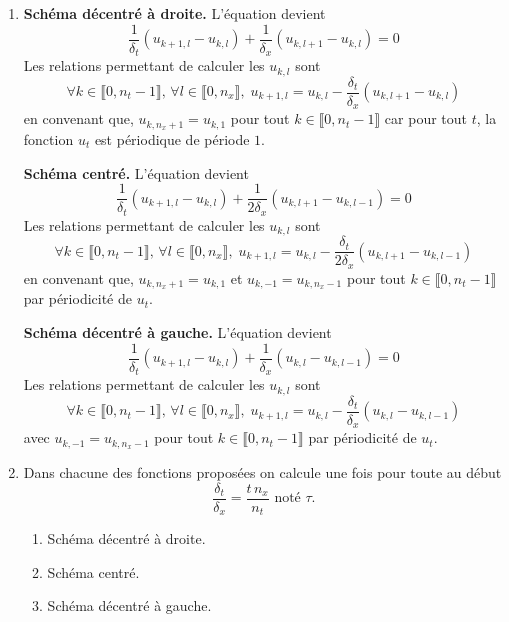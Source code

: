 \begin{enumerate}
 \item 
 \textbf{Schéma décentré à droite.} 
 L'équation devient
\[
 \frac{1}{\delta_t}\left( u_{k+1,l} - u_{k,l}\right) +  \frac{1}{\delta_x}\left( u_{k,l+1} - u_{k,l}\right) = 0
\]
Les relations permettant de calculer les $u_{k,l}$ sont
\[
 \forall k\in\llbracket 0, n_t-1\rrbracket, \, \forall l \in \llbracket 0, n_x \rrbracket, \;
 u_{k+1,l} = u_{k,l} - \frac{\delta_t}{\delta_x}\left( u_{k,l+1} - u_{k,l}\right) 
\]
en convenant que, $u_{k,n_x + 1} = u_{k,1}$ pour tout $k\in\llbracket 0, n_t-1\rrbracket$ car pour tout $t$, la fonction $u_t$ est périodique de période $1$.
 
 \textbf{Schéma centré.}
 L'équation devient
\[
 \frac{1}{\delta_t}\left( u_{k+1,l} - u_{k,l}\right) +  \frac{1}{2\delta_x}\left( u_{k,l+1} - u_{k,l-1}\right) = 0
\]
Les relations permettant de calculer les $u_{k,l}$ sont
\[
 \forall k\in\llbracket 0, n_t-1\rrbracket, \, \forall l \in \llbracket 0, n_x \rrbracket, \;
 u_{k+1,l} = u_{k,l} - \frac{\delta_t}{2\delta_x}\left( u_{k,l+1} - u_{k,l-1}\right) 
\]
en convenant que, $u_{k,n_x + 1} = u_{k,1}$ et $u_{k, -1} = u_{k,n_x - 1}$ pour tout $k\in\llbracket 0, n_t-1\rrbracket$ par périodicité de $u_t$.
 
 \textbf{Schéma décentré à gauche.}
 L'équation devient
\[
 \frac{1}{\delta_t}\left( u_{k+1,l} - u_{k,l}\right) +  \frac{1}{\delta_x}\left( u_{k,l} - u_{k,l-1}\right) = 0
\]
Les relations permettant de calculer les $u_{k,l}$ sont
\[
 \forall k\in\llbracket 0, n_t-1\rrbracket, \, \forall l \in \llbracket 0, n_x \rrbracket, \;
 u_{k+1,l} = u_{k,l} - \frac{\delta_t}{\delta_x}\left( u_{k,l} - u_{k,l-1}\right) 
\]
avec $u_{k, -1} = u_{k,n_x - 1}$ pour tout $k\in\llbracket 0, n_t-1\rrbracket$ par périodicité de $u_t$.

 \item
 Dans chacune des fonctions proposées on calcule une fois pour toute au début 
\[
\frac{\delta_t}{\delta_x}=\frac{t\,n_x}{n_t} \text{ noté } \tau. 
\]

 \begin{enumerate}
  \item Schéma décentré à droite.
     
  \item Schéma centré.
     
  \item Schéma décentré à gauche.
     
 \end{enumerate}


\end{enumerate}
